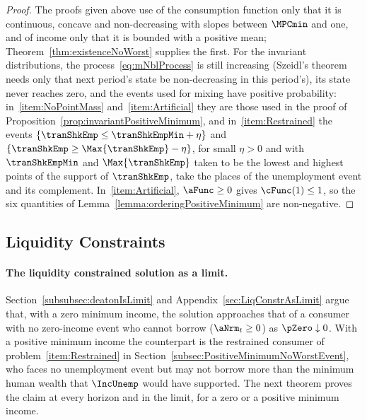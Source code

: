 \documentclass[\econtexRoot/BufferStockTheory]{subfiles}
\begin{document}
\begin{proof}
The proofs given above use of the consumption function only that it is continuous, concave and non-decreasing with slopes between $\MPCmin$ and one, and of income only that it is bounded with a positive mean; Theorem~\ref{thm:existenceNoWorst} supplies the first.
For the invariant distributions, the process~\eqref{eq:mNblProcess} is still increasing (Szeidl's theorem needs only that next period's state be non-decreasing in this period's), its state never reaches zero, and the events used for mixing have positive probability: in~\ref{item:NoPointMass} and~\ref{item:Artificial} they are those used in the proof of Proposition~\ref{prop:invariantPositiveMinimum}, and in~\ref{item:Restrained} the events $\{\tranShkEmp\leq\tranShkEmpMin+\eta\}$ and $\{\tranShkEmp\geq\Max{\tranShkEmp}-\eta\}$, for small $\eta>0$ and with $\tranShkEmpMin$ and $\Max{\tranShkEmp}$ taken to be the lowest and highest points of the support of $\tranShkEmp$, take the places of the unemployment event and its complement.
In~\ref{item:Artificial}, $\aFunc\geq 0$ gives $\cFunc(1)\leq 1$, so the six quantities of Lemma~\ref{lemma:orderingPositiveMinimum} are non-negative.
\end{proof}

\subsection{Liquidity Constraints}\label{subsec:PositiveMinimumLiqConstr}

\paragraph{The liquidity constrained solution as a limit.}
Section~\ref{subsubsec:deatonIsLimit} and Appendix~\ref{sec:LiqConstrAsLimit} argue that, with a zero minimum income, the solution approaches that of a consumer with no zero-income event who cannot borrow ($\aNrm_{t}\geq 0$) as $\pZero\downarrow 0$.
With a positive minimum income the counterpart is the restrained consumer of problem~\ref{item:Restrained} in Section~\ref{subsec:PositiveMinimumNoWorstEvent}, who faces no unemployment event but may not borrow more than the minimum human wealth that $\IncUnemp$ would have supported.
The next theorem proves the claim at every horizon and in the limit, for a zero or a positive minimum income.
\end{document}
